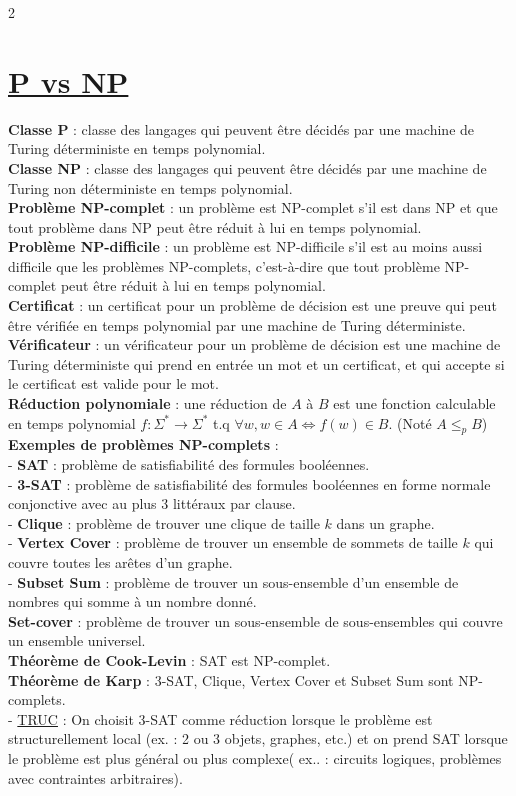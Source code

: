 \documentclass[11pt]{article}
\begin{document}
\begin{multicols}{2}
\section{\underline{P vs NP}}
\textbf{Classe P} : classe des langages qui peuvent être décidés par une machine de Turing déterministe en temps polynomial.\\
\textbf{Classe NP} : classe des langages qui peuvent être décidés par une machine de Turing non déterministe en temps polynomial.\\
\textbf{Problème NP-complet} : un problème est NP-complet s'il est dans NP et que tout problème dans NP peut être réduit à lui en temps polynomial.\\
\textbf{Problème NP-difficile} : un problème est NP-difficile s'il est au moins aussi difficile que les problèmes NP-complets, c'est-à-dire que tout problème NP-complet peut être réduit à lui en temps polynomial.\\
\textbf{Certificat} : un certificat pour un problème de décision est une preuve qui peut être vérifiée en temps polynomial par une machine de Turing déterministe.\\
\textbf{Vérificateur} : un vérificateur pour un problème de décision est une machine de Turing déterministe qui prend en entrée un mot et un certificat, et qui accepte si le certificat est valide pour le mot.\\
\textbf{Réduction polynomiale} : une réduction de $A$ à $B$ est une fonction calculable en temps polynomial $f: \Sigma^* \rightarrow \Sigma^*$ t.q $\forall w, w \in A \iff f(w) \in B$.
(Noté $A \leq_p B$)\\
\textbf{Exemples de problèmes NP-complets} :\\
- \textbf{SAT} : problème de satisfiabilité des formules booléennes.\\
- \textbf{3-SAT} : problème de satisfiabilité des formules booléennes en forme normale conjonctive avec au plus 3 littéraux par clause.\\
- \textbf{Clique} : problème de trouver une clique de taille $k$ dans un graphe.\\
- \textbf{Vertex Cover} : problème de trouver un ensemble de sommets de taille $k$ qui couvre toutes les arêtes d'un graphe.\\
- \textbf{Subset Sum} : problème de trouver un sous-ensemble d'un ensemble de nombres qui somme à un nombre donné.\\
\textbf{Set-cover} : problème de trouver un sous-ensemble de sous-ensembles qui couvre un ensemble universel.\\
\textbf{Théorème de Cook-Levin} : SAT est NP-complet.\\
\textbf{Théorème de Karp} : 3-SAT, Clique, Vertex Cover et Subset Sum sont NP-complets.\\
- \underline{TRUC} : On choisit 3-SAT comme réduction lorsque le problème est structurellement local (ex. : 2 ou 3 objets, graphes, etc.) et on prend SAT lorsque le problème est plus général ou plus complexe( ex.. : circuits logiques, problèmes avec contraintes arbitraires).\\


\end{multicols}
\end{document}
